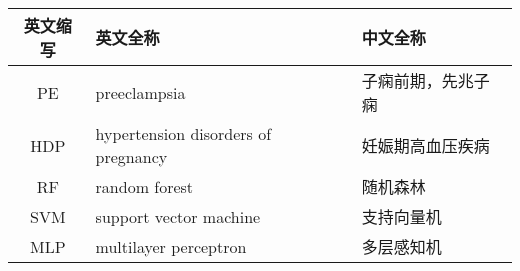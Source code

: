 \cleardoublepage
{}
\begin{table}[htbp]
    \centering
    \fontsize{10}{6}
    \begin{tabularx}{\linewidth}{cX<{\centering}X<{\centering}}
        \toprule \textbf{英文缩写}&\textbf{英文全称}&\textbf{中文全称}\\
        \midrule PE&preeclampsia&子痫前期，先兆子痫\\
        HDP&hypertension disorders of pregnancy&妊娠期高血压疾病\\
        RF&random forest&随机森林\\
        SVM&support vector machine&支持向量机\\
        MLP&multilayer perceptron&多层感知机\\
        \bottomrule
    \end{tabularx}
\end{table}
